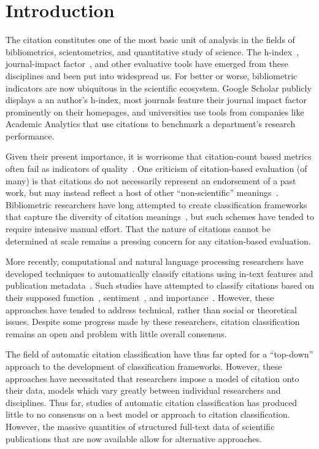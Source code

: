 \documentclass[
10pt, %
a4paper, %
oneside, %
headinclude,footinclude, %
BCOR5mm, %
]{scrartcl}
\begin{document}
\section{Introduction}

The citation constitutes one of the most basic unit of analysis in the fields of bibliometrics, scientometrics, and quantitative study of science. The h-index~\cite{hirsch_index_2005}, journal-impact factor~\cite{garfield_citation_1955}, and other evaluative tools have emerged from these disciplines and been put into widespread us. For better or worse, bibliometric indicators are now ubiquitous in the scientific ecosystem. Google Scholar publicly displays a an author’s h-index, most journals feature their journal impact factor prominently on their homepages, and universities use tools from companies like Academic Analytics that use citations to benchmark a department’s research performance. 

Given their present importance, it is worrisome that citation-count based metrics often fail as indicators of quality~\cite{leydesdorff_citations:_2016}. One criticism of citation-based evaluation (of many) is that citations do not necessarily represent an endorsement of a past work, but may instead reflect a host of other “non-scientific” meanings~\cite{lutz_bornmann_what_2008}. Bibliometric researchers have long attempted to create classification frameworks that capture the diversity of citation meanings~\cite{moravcsik_results_1975}, but such schemes have tended to require intensive manual effort. That the nature of citations cannot be determined at scale remains a pressing concern for any citation-based evaluation.

More recently, computational and natural language processing researchers have developed techniques to automatically classify citations using in-text features and publication metadata~\cite{jha_nlp-driven_2017}. Such studies have attempted to classify citations based on their supposed function~\cite{teufel_automatic_2006}, sentiment~\cite{catalini_incidence_2015}, and importance~\cite{valenzuela_identifying_2015}. However, these approaches have tended to address technical, rather than social or theoretical issues. Despite some progress made by these researchers, citation classification remains an open and  problem with little overall consensus.

The field of automatic citation classification have thus far opted for a “top-down” approach to the development of classification frameworks. However, these approaches have necessitated that researchers impose a model of citation onto their data, models which vary greatly between individual researchers and disciplines. Thus far, studies of automatic citation classification has produced little to no consensus on a best model or approach to citation classification. However, the massive quantities of structured full-text data of scientific publications that are now available allow for alternative approaches. 
\end{document}
